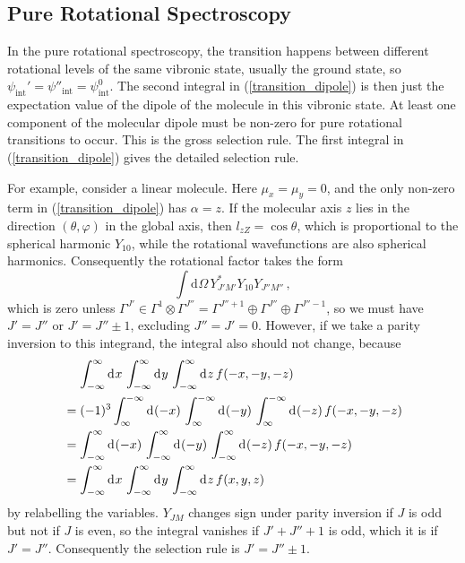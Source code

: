 \documentclass{article}
\theoremstyle{plain}\theoremheaderfont{\normalfont\itshape}\theorembodyfont{\rmfamily}\theoremseparator{.}\newtheorem*{rem}{Remark}\newtheorem*{ex}{Example}\newtheorem*{proof}{Proof}\newtheorem*{altp}{Alternative proof}
\theoremstyle{plain}\theoremheaderfont{\normalfont\bfseries}\theorembodyfont{\rmfamily}\theoremseparator{.}\newtheorem{thm}{Theorem}[section]\newtheorem{lem}[thm]{Lemma}\newtheorem{prop}[thm]{Proposition}\newtheorem*{cor}{Corollary}\newtheorem{defn}[thm]{Definition}\newtheorem{clm}[thm]{Claim}\newtheorem{clminproof}{Claim}\newtheorem*{law}{Law}\newtheorem{pos}[thm]{Postulate}
\theoremstyle{break}\theoremheaderfont{\normalfont\itshape}\theorembodyfont{\rmfamily}\theoremseparator{.\medskip}\newtheorem*{proofskip}{Proof}\newtheorem*{exs}{Examples}\newtheorem*{rems}{Remarks}
\theoremstyle{break}\theoremheaderfont{\normalfont\bfseries}\theorembodyfont{\rmfamily}\theoremseparator{.\medskip}\newtheorem{lemskip}[thm]{Lemma}\newtheorem{defnskip}[thm]{Definition}\newtheorem{propskip}[thm]{Proposition}\newtheorem{thmskip}[thm]{Theorem}
\numberwithin{equation}{section}
\newcommand{\dd}[2][]{\mathrm{d}^{#1} #2\,}
\begin{document}
    \subsection{Pure Rotational Spectroscopy}
    In the pure rotational spectroscopy, the transition happens between different rotational levels of the same vibronic state, usually the ground state, so \(\psi_{\text{int}}'=\psi''_{\text{int}}=\psi_{\text{int}}^0\). The second integral in (\ref{transition_dipole}) is then just the expectation value of the dipole of the molecule in this vibronic state. At least one component of the molecular dipole must be non-zero for pure rotational transitions to occur. This is the gross selection rule. The first integral in (\ref{transition_dipole}) gives the detailed selection rule.

    For example, consider a linear molecule. Here \(\mu_x=\mu_y=0\), and the only non-zero term in (\ref{transition_dipole}) has \(\alpha=z\). If the molecular axis \(z\) lies in the direction \((\theta,\varphi)\) in the global axis, then \(l_{zZ}=\cos\theta\), which is proportional to the spherical harmonic \(Y_{10}\), while the rotational wavefunctions are also spherical harmonics. Consequently the rotational factor takes the form
    \begin{equation}
        \int\dd{\Omega}Y_{J'M'}^*Y_{10}Y_{J''M''}\,,
    \end{equation}
    which is zero unless \(\Gamma^{J'}\in\Gamma^{1}\otimes\Gamma^{J''}=\Gamma^{J''+1}\oplus\Gamma^{J''}\oplus\Gamma^{J''-1}\), so we must have \(J'=J''\) or \(J'=J''\pm 1\), excluding \(J''=J'=0\). However, if we take a parity inversion to this integrand, the integral also should not change, because
    \begin{align}
        &\quad\,\int_{-\infty}^{\infty}\dd{x}\int_{-\infty}^{\infty}\dd{y}\int_{-\infty}^{\infty}\dd{z}f(-x,-y,-z)\notag\\
        &=(-1)^3\int_{\infty}^{-\infty}\dd{(-x)}\int_{\infty}^{-\infty}\dd{(-y)}\int_{\infty}^{-\infty}\dd{(-z)}f(-x,-y,-z)\notag\\
        &=\int_{-\infty}^{\infty}\dd{(-x)}\int_{-\infty}^{\infty}\dd{(-y)}\int_{-\infty}^{\infty}\dd{(-z)}f(-x,-y,-z)\notag\\
        &=\int_{-\infty}^{\infty}\dd{x}\int_{-\infty}^{\infty}\dd{y}\int_{-\infty}^{\infty}\dd{z}f(x,y,z)
    \end{align}
    by relabelling the variables. \(Y_{JM}\) changes sign under parity inversion if \(J\) is odd but not if \(J\) is even, so the integral vanishes if \(J'+J''+1\) is odd, which it is if \(J'=J''\). Consequently the selection rule is \(J'=J''\pm 1\).
\end{document}
